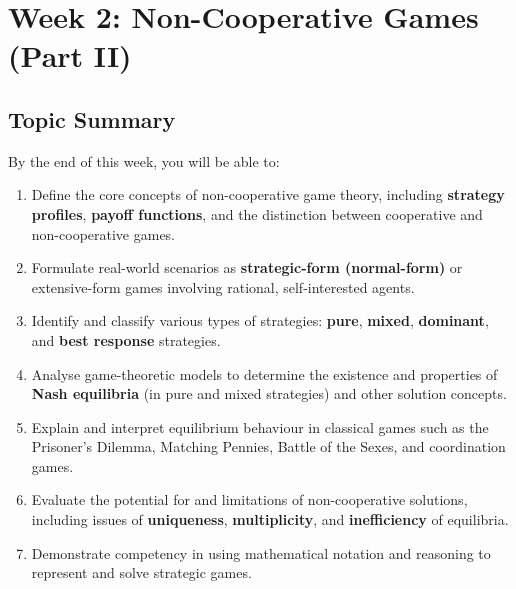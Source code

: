 \section{Week 2: Non-Cooperative Games (Part II)}

\subsection{Topic Summary}

\begin{keybox}
By the end of this week, you will be able to:
\begin{enumerate}
  \item Define the core concepts of non-cooperative game theory, including \textbf{strategy profiles}, \textbf{payoff functions}, and the distinction between cooperative and non-cooperative games.
  \item Formulate real-world scenarios as \textbf{strategic-form (normal-form)} or extensive-form games involving rational, self-interested agents.
  \item Identify and classify various types of strategies: \textbf{pure}, \textbf{mixed}, \textbf{dominant}, and \textbf{best response} strategies.
  \item Analyse game-theoretic models to determine the existence and properties of \textbf{Nash equilibria} (in pure and mixed strategies) and other solution concepts.
  \item Explain and interpret equilibrium behaviour in classical games such as the Prisoner's Dilemma, Matching Pennies, Battle of the Sexes, and coordination games.
  \item Evaluate the potential for and limitations of non-cooperative solutions, including issues of \textbf{uniqueness}, \textbf{multiplicity}, and \textbf{inefficiency} of equilibria.
  \item Demonstrate competency in using mathematical notation and reasoning to represent and solve strategic games.
\end{enumerate}
\end{keybox}


